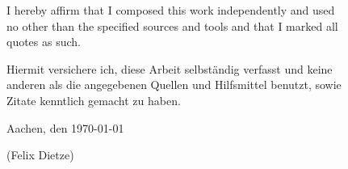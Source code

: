 
\pagestyle{fancyplain}

\begin{figure}
I hereby affirm that I composed this work independently and used no other than the specified sources and tools and
that I marked all quotes as such.
\bigskip

Hiermit versichere ich, diese Arbeit selbst\"andig verfasst und keine anderen als die angegebenen Quellen und
Hilfsmittel benutzt, sowie Zitate kenntlich gemacht zu haben.
\medskip

\begin{flushright}
Aachen, den \today

\vspace{1.5cm}
\small
(Felix Dietze)
\end{flushright}
\end{figure}

